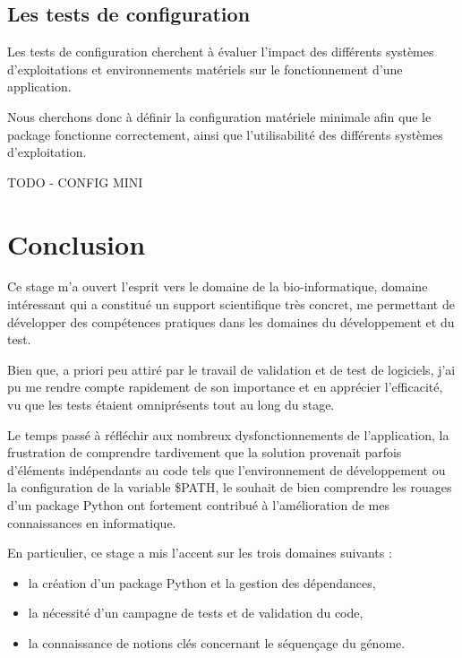 \documentclass[twoside,a4paper,11pt,frenchb,openany]{report}
\begin{document}
\section{Les tests de configuration}

Les tests de configuration cherchent à évaluer l'impact des différents systèmes d'exploitations et environnements matériels sur le fonctionnement d'une application.

Nous cherchons donc à définir la configuration matériele minimale afin que le package fonctionne correctement, ainsi que l'utilisabilité des différents systèmes d'exploitation.

TODO - CONFIG MINI






\chapter{Conclusion}

Ce stage m'a ouvert l'esprit vers le domaine de la bio-informatique, domaine intéressant qui a constitué un support scientifique très concret, me permettant de développer des compétences pratiques dans les domaines du développement et du test. 

Bien que, a priori peu attiré par le travail de validation et de test de logiciels, j'ai pu me rendre compte rapidement de son importance et en apprécier l'efficacité, vu que les tests étaient omniprésents tout au long du stage.   

Le temps passé à réfléchir aux nombreux dysfonctionnements de l'application, la frustration de comprendre tardivement que la solution provenait parfois d'éléments indépendants au code tels que l'environnement de développement ou la configuration de la variable \$PATH, le souhait de bien comprendre les rouages d'un package Python ont fortement contribué à l'amélioration de mes connaissances en informatique. 

En particulier, ce stage a mis l'accent sur les trois domaines suivants :
\begin{itemize}
\item la création d'un package Python et la gestion des dépendances,
\item la nécessité d'un campagne de tests et de validation du code,
\item la connaissance de notions clés concernant le séquençage du génome. 
\end{itemize}
\end{document}
